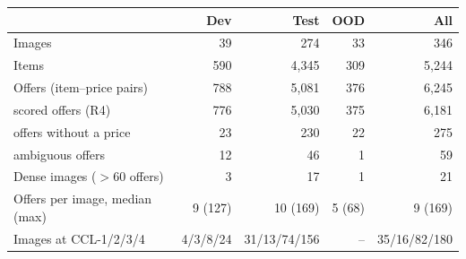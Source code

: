 \begin{tabular}{@{}lrrrr@{}}
\toprule
 & Dev & Test & OOD & All \\
\midrule
Images & 39 & 274 & 33 & 346 \\
Items & 590 & 4{,}345 & 309 & 5{,}244 \\
Offers (item--price pairs) & 788 & 5{,}081 & 376 & 6{,}245 \\
\quad scored offers (R4) & 776 & 5{,}030 & 375 & 6{,}181 \\
\quad offers without a price & 23 & 230 & 22 & 275 \\
\quad ambiguous offers & 12 & 46 & 1 & 59 \\
Dense images ($>$60 offers) & 3 & 17 & 1 & 21 \\
Offers per image, median (max) & 9 (127) & 10 (169) & 5 (68) & 9 (169) \\
Images at CCL-1/2/3/4 & 4/3/8/24 & 31/13/74/156 & -- & 35/16/82/180 \\
\bottomrule
\end{tabular}
